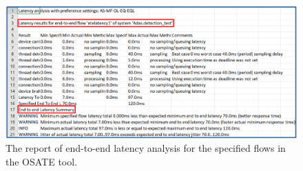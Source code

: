 \begin{figure}[ht]
\centering
\includegraphics[width=1\textwidth]{figures/etelatency_osate.pdf}
\caption{ The report of end-to-end latency analysis for the specified flows in the OSATE tool.}
\label{fig045}
\end{figure}


